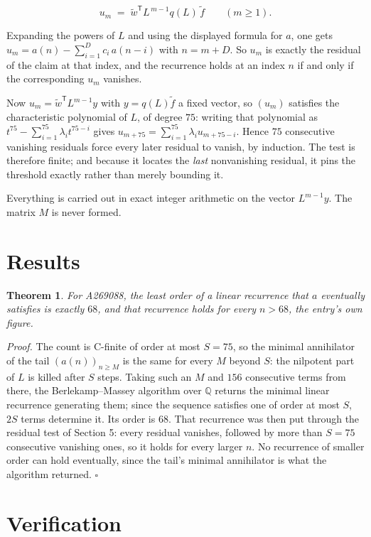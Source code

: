 \documentclass[11pt]{article}
\newtheorem{theorem}{Theorem}
\theoremstyle{definition}
\begin{document}
\[u_m \;=\; \tilde w^{\mathsf T} L^{\,m-1} q(L)\,\tilde f \qquad (m \ge 1).\]

Expanding the powers of $L$ and using the displayed formula for $a$, one gets $u_m = a(n) - \sum_{i=1}^{D} c_i\,a(n-i)$ with $n = m + D$. So $u_m$ is exactly the residual of the claim at that index, and the recurrence holds at an index $n$ if and only if the corresponding $u_m$ vanishes.

Now $u_m = \tilde w^{\mathsf T} L^{m-1} y$ with $y = q(L)\tilde f$ a fixed vector, so $(u_m)$ satisfies the characteristic polynomial of $L$, of degree $75$: writing that polynomial as $t^{75} - \sum_{i=1}^{75} \lambda_i t^{75-i}$ gives $u_{m+75} = \sum_{i=1}^{75} \lambda_i u_{m+75-i}$. Hence $75$ consecutive vanishing residuals force every later residual to vanish, by induction. The test is therefore finite; and because it locates the {\itshape last} nonvanishing residual, it pins the threshold exactly rather than merely bounding it.

Everything is carried out in exact integer arithmetic on the vector $L^{m-1}y$. The matrix $M$ is never formed.

\section{Results}

\begin{theorem} For A269088, the least order of a linear recurrence that $a$ eventually satisfies is exactly $68$, and that recurrence holds for every $n > 68$, the entry's own figure.\end{theorem}

{\itshape Proof.} The count is C-finite of order at most $S = 75$, so the minimal annihilator of the tail $(a(n))_{n \ge M}$ is the same for every $M$ beyond $S$: the nilpotent part of $L$ is killed after $S$ steps. Taking such an $M$ and $156$ consecutive terms from there, the Berlekamp--Massey algorithm over $\mathbb{Q}$ returns the minimal linear recurrence generating them; since the sequence satisfies one of order at most $S$, $2S$ terms determine it. Its order is $68$. That recurrence was then put through the residual test of Section 5: every residual vanishes, followed by more than $S = 75$ consecutive vanishing ones, so it holds for every larger $n$. No recurrence of smaller order can hold eventually, since the tail's minimal annihilator is what the algorithm returned. $\square$

\section{Verification}
\end{document}
